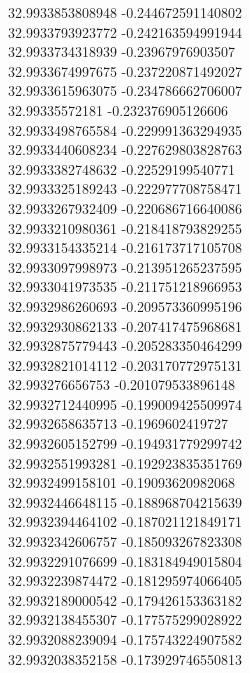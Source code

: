 {32.9933853808948	-0.244672591140802\\
32.9933793923772	-0.242163594991944\\
32.9933734318939	-0.23967976903507\\
32.9933674997675	-0.237220871492027\\
32.9933615963075	-0.234786662706007\\
32.99335572181	-0.232376905126606\\
32.9933498765584	-0.229991363294935\\
32.9933440608234	-0.227629803828763\\
32.9933382748632	-0.22529199540771\\
32.9933325189243	-0.222977708758471\\
32.9933267932409	-0.220686716640086\\
32.9933210980361	-0.218418793829255\\
32.9933154335214	-0.216173717105708\\
32.9933097998973	-0.213951265237595\\
32.9933041973535	-0.211751218966953\\
32.9932986260693	-0.209573360995196\\
32.9932930862133	-0.207417475968681\\
32.9932875779443	-0.205283350464299\\
32.9932821014112	-0.203170772975131\\
32.993276656753	-0.201079533896148\\
32.9932712440995	-0.199009425509974\\
32.9932658635713	-0.1969602419727\\
32.9932605152799	-0.194931779299742\\
32.9932551993281	-0.192923835351769\\
32.9932499158101	-0.19093620982068\\
32.9932446648115	-0.188968704215639\\
32.9932394464102	-0.187021121849171\\
32.9932342606757	-0.185093267823308\\
32.9932291076699	-0.183184949015804\\
32.9932239874472	-0.181295974066405\\
32.9932189000542	-0.179426153363182\\
32.9932138455307	-0.177575299028922\\
32.9932088239094	-0.175743224907582\\
32.9932038352158	-0.173929746550813\\
}
